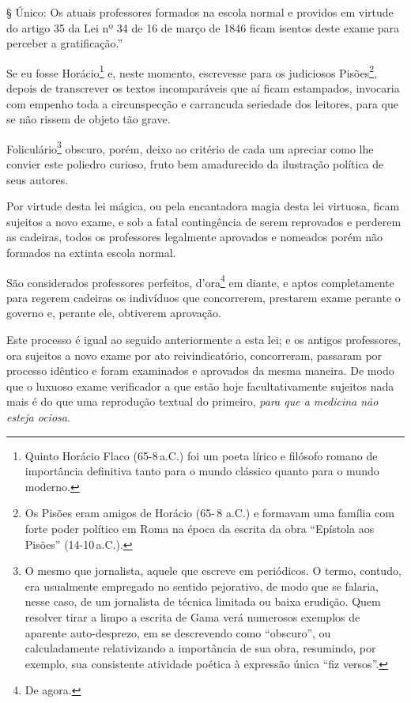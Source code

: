 § Único: Os atuais professores formados na escola normal e providos em
virtude do artigo 35 da Lei nº 34 de 16 de março de 1846 ficam isentos
deste exame para perceber a gratificação.''

Se eu fosse Horácio\footnote{Quinto Horácio Flaco (65-8\,a.C.) foi
  um poeta lírico e filósofo romano de importância definitiva tanto para
  o mundo clássico quanto para o mundo moderno.} e, neste momento,
escrevesse para os judiciosos Pisões\footnote{Os Pisões eram amigos de
  Horácio (65-\,8 a.C.) e formavam uma família com forte poder
  político em Roma na época da escrita da obra ``Epístola aos Pisões''
  (14-10\,a.C.).}, depois de transcrever os textos incomparáveis que aí
ficam estampados, invocaria com empenho toda a circunspecção e
carrancuda seriedade dos leitores, para que se não rissem de objeto tão
grave.

Foliculário\footnote{O mesmo que jornalista, aquele que escreve em
  periódicos. O termo, contudo, era usualmente empregado no sentido
  pejorativo, de modo que se falaria, nesse caso, de um jornalista de
  técnica limitada ou baixa erudição. Quem resolver tirar a limpo a
  escrita de Gama verá numerosos exemplos de aparente auto-desprezo, em
  se descrevendo como ``obscuro'', ou calculadamente relativizando a
  importância de sua obra, resumindo, por exemplo, sua consistente
  atividade poética à expressão única ``fiz versos''.} obscuro, porém,
deixo ao critério de cada um apreciar como lhe convier este poliedro
curioso, fruto bem amadurecido da ilustração política de seus autores.

Por virtude desta lei mágica, ou pela encantadora magia desta lei
virtuosa, ficam sujeitos a novo exame, e sob a fatal contingência de
serem reprovados e perderem as cadeiras, todos os professores legalmente
aprovados e nomeados porém não formados na extinta escola normal.

São considerados professores perfeitos, d'ora\footnote{De agora.} em
diante, e aptos completamente para regerem cadeiras os indivíduos que
concorrerem, prestarem exame perante o governo e, perante ele, obtiverem
aprovação.

Este processo é igual ao seguido anteriormente a esta lei; e os antigos
professores, ora sujeitos a novo exame por ato reivindicatório,
concorreram, passaram por processo idêntico e foram examinados e
aprovados da mesma maneira. De modo que o luxuoso exame verificador a
que estão hoje facultativamente sujeitos nada mais é do que uma
reprodução textual do primeiro, \emph{para que a medicina não esteja
ociosa}.

